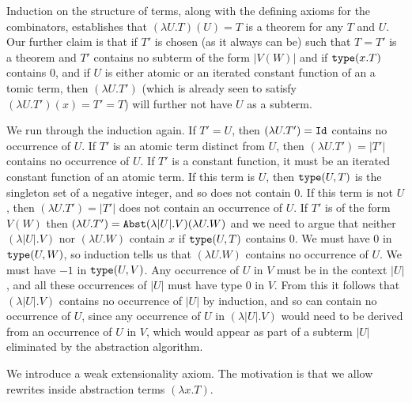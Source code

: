 \documentclass[12pt]{article}
\begin{document}
\begin{description}
Induction on the structure of terms, along with the defining axioms
for the combinators, establishes that $(\lambda U.T)(U)=T$ is a
theorem for any $T$ and $U$.  Our further claim is that if $T'$ is
chosen (as it always can be) such that $T=T'$ is a theorem and $T'$
contains no subterm of the form $|V(W)|$ and if ${\tt type}(x.T)$
contains 0, and if $U$ is either atomic or an iterated constant
function of an a tomic term, then $(\lambda U.T')$ (which is already
seen to satisfy $(\lambda U.T')(x) = T' = T$) will further not have
$U$ as a subterm.

We run through the induction again.  If $T'=U$, then $(\lambda
U.T')={\tt Id}$ contains no occurrence of $U$.  If $T'$ is an atomic
term distinct from $U$, then $(\lambda U.T')=|T'|$ contains no
occurrence of $U$.  If $T'$ is a constant function, it must be an
iterated constant function of an atomic term.  If this term is $U$,
then ${\tt type}(U,T)$ is the singleton set of a negative integer, and
so does not contain 0.  If this term is not $U$, then $(\lambda
U.T')=|T'|$ does not contain an occurrence of $U$.  If $T'$ is of the
form $V(W)$ then $(\lambda U.T')={\tt Abst}(\lambda |U|.V)(\lambda
U.W)$ and we need to argue that neither $(\lambda |U|.V)$ nor
$(\lambda U.W)$ contain $x$ if ${\tt type}(U,T)$ contains 0.  We must
have 0 in ${\tt type}(U,W)$, so induction tells us that $(\lambda
U.W)$ contains no occurrence of $U$.  We must have $-1$ in ${\tt
type}(U,V)$.  Any occurrence of $U$ in $V$ must be in the context
$|U|$, and all these occurrences of $|U|$ must have type 0 in $V$.
From this it follows that $(\lambda |U|.V)$ contains no occurrence of
$|U|$ by induction, and so can contain no occurrence of $U$, since any
occurrence of $U$ in $(\lambda |U|.V)$ would need to be derived from
an occurrence of $U$ in $V$, which would appear as part of a subterm
$|U|$ eliminated by the abstraction algorithm.

\end{description}

We introduce a weak extensionality axiom.  The motivation is that we allow
rewrites inside abstraction terms $(\lambda x.T)$.
\end{document}
